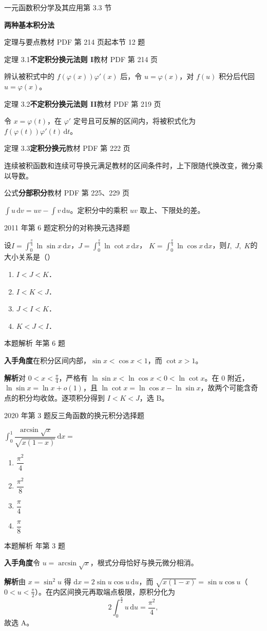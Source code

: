 \documentclass[UTF8,zihao=-4,fontset=fandol]{ctexart}
\newcommand{\SectionHeading}[4]{%
  \clearpage\hypertarget{sec-#1}{}%
  {\small\textcolor{accent}{#2\hfill 第 #1 节}}\par\medskip
  {\LARGE\bfseries #3}\par\smallskip
  {\small\textcolor{muted}{#4}}\par\bigskip}
\newcommand{\Theory}[4]{%
  {\small\textcolor{accent}{#1}\quad\textbf{#3}\hfill\textcolor{muted}{教材 PDF 第 #2 页}}\par
  {\small #4}\par\smallskip}
\newcommand{\pickout}{\hfill（\hspace{1.4em}）}
\newenvironment{abcd}{\begin{enumerate}[label=\textup{(\Alph*)},leftmargin=2.3em,itemsep=1pt,topsep=4pt,parsep=1pt]}{\end{enumerate}}
\newcommand{\choices}[4]{%
  \begin{abcd}
    \item #1
    \item #2
    \item #3
    \item #4
  \end{abcd}}
\newcommand{\QuestionPage}[6]{%
  \par\noindent\begin{minipage}{\linewidth}
  \raggedright
  {\small\textcolor{black!60}{#3\quad #5}\hfill\textcolor{accent}{#2}}\par\smallskip}
\newcommand{\QuestionEnd}{\end{minipage}\par\medskip}
\newcommand{\QuestionPage}[6]{%
  \clearpage
  {\small\textcolor{accent}{#1\hfill #2}}\par\medskip
  {\small\textcolor{black!60}{#3\quad #5\hfill #6}}\par\vspace{9bp}}
\newcommand{\QuestionEnd}{}
\newenvironment{QuestionSolution}[1]{%
  \clearpage
  {\small\textcolor{black!60}{本题解析\quad #1}}\par\medskip
}{\par\clearpage}
\begin{document}
\SectionHeading{3.3}{一元函数积分学及其应用}{两种基本积分法}{定理与要点\quad 教材 PDF 第 214 页起\hfill 本节 12 题}
\Theory{定理 3.1}{214}{不定积分换元法则 I}{辨认被积式中的 \(f(\varphi(x))\varphi'(x)\) 后，令 \(u=\varphi(x)\)，对 \(f(u)\) 积分后代回 \(u=\varphi(x)\)。}
\Theory{定理 3.2}{219}{不定积分换元法则 II}{令 \(x=\varphi(t)\)，在 \(\varphi'\) 定号且可反解的区间内，将被积式化为 \(f(\varphi(t))\varphi'(t)\,\mathrm{d}t\)。}
\Theory{定理 3.3}{222}{定积分换元}{连续被积函数和连续可导换元满足教材的区间条件时，上下限随代换改变，微分乘以导数。}
\Theory{公式}{225、229}{分部积分}{\(\int u\,\mathrm{d}v=uv-\int v\,\mathrm{d}u\)。定积分中的乘积 \(uv\) 取上、下限处的差。}
\QuestionPage{3.3 两种基本积分法}{选择题}{2011 年第 6 题}{1}{定积分的对称换元}{152 / 234}
设$I = \int_{0}^{\frac{\pi}{4}}\ln\sin x\,\mathrm{d} x$，$J = \int_{0}^{\frac{\pi}{4}}\ln\cot x\,\mathrm{d} x$，
$K = \int_{0}^{\frac{\pi}{4}}\ln\cos x\,\mathrm{d} x$，则$I,\;J,\;K$的大小关系是\pickout{}
\begin{abcd}
\item $I < J < K$．
\item $I < K < J$．
\item $J < I < K$．
\item $K < J < I$．
\end{abcd}
\QuestionEnd

\begin{QuestionSolution}{2011 年第 6 题}
\textbf{入手角度}\quad 在积分区间内部，\(\sin x<\cos x<1\)，而 \(\cot x>1\)。

\textbf{解析}\quad 对 \(0<x<\frac{\pi}{4}\)，严格有 \(\ln\sin x<\ln\cos x<0<\ln\cot x\)。在 \(0\) 附近，\(\ln\sin x=\ln x+o(1)\)，且 \(\ln\cot x=\ln\cos x-\ln\sin x\)，故两个可能含奇点的积分均收敛。逐项积分得到 \(I<K<J\)，选 B。
\end{QuestionSolution}

\QuestionPage{3.3 两种基本积分法}{选择题}{2020 年第 3 题}{1}{反三角函数的换元积分}{153 / 234}
\(\int_{0}^{1}{\dfrac{\arcsin \sqrt{x}}{\sqrt{x\left( 1-x \right)}} \,\mathrm{d} x} =\)
\choices{\(\dfrac{\pi^{2}}{4}\)}{\(\dfrac{\pi^{2}}{8}\)}{\(\dfrac{\pi}{4}\)}{\(\dfrac{\pi}{8}\)}
\QuestionEnd

\begin{QuestionSolution}{2020 年第 3 题}
\textbf{入手角度}\quad 令 \(u=\arcsin\sqrt{x}\)，根式分母恰好与换元微分相消。

\textbf{解析}\quad 由 \(x=\sin^2u\) 得 \(\mathrm{d}x=2\sin u\cos u\,\mathrm{d}u\)，而 \(\sqrt{x(1-x)}=\sin u\cos u\)（\(0<u<\frac{\pi}{2}\)）。在内区间换元再取端点极限，原积分化为
\[
2\int_0^{\frac{\pi}{2}}u\,\mathrm{d}u=\frac{\pi^2}{4},
\]
故选 A。
\end{QuestionSolution}
\end{document}
